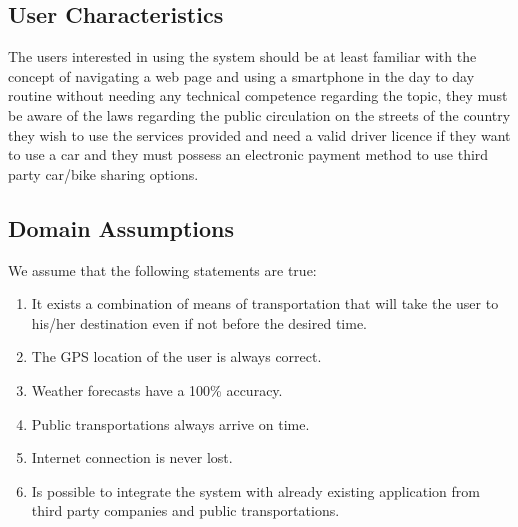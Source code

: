 \subsection{User Characteristics}
The users interested in using the system should be at least familiar with the concept of navigating a web page and using a smartphone in the day to day routine without needing any technical competence regarding the topic, they must be aware of the laws regarding the public circulation on the streets of the country they wish to use the services provided and need a valid driver licence if they want to use a car and they must possess an electronic payment method to use third party car/bike sharing options.
\par
\subsection{Domain Assumptions}
We assume that the following statements are true:
\begin{enumerate}
\item It exists a combination of means of transportation that will take the user to his/her destination even if not before the desired time.
\item The GPS location of the user is always correct.
\item Weather forecasts have a 100\% accuracy.
\item Public transportations always arrive on time.
\item Internet connection is never lost.
\item Is possible to integrate the system with already existing application from third party companies and public transportations.
\end{enumerate}